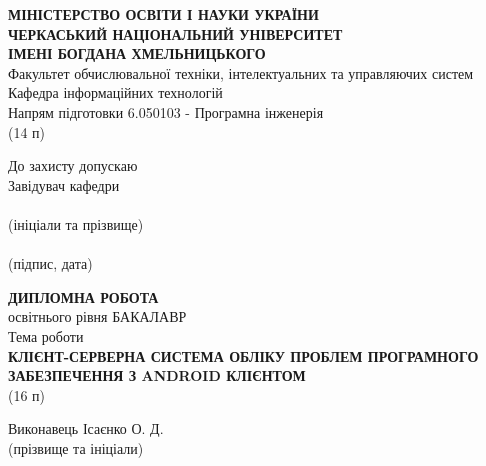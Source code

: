 \documentclass[../main.tex]{subfiles}
\begin{document}
\begin{titlepage}
    \centering
    {\bfseries\large
    \MakeUppercase{Міністерство освіти і науки України} \\
    \MakeUppercase{Черкаський національний університет} \\
    \MakeUppercase{імені Богдана Хмельницького} \\}
    Факультет обчислювальної техніки, інтелектуальних та управляючих систем \\
    Кафедра інформаційних технологій \\
    Напрям підготовки 6.050103 - Програмна інженерія \\
    (14 п) \\
    \begin{flushright}
        \begin{minipage}[t]{5cm}
            \begin{flushright}
            	\footnotesize
                До захисту допускаю \\
                Завідувач кафедри \\
                \hrulefill \\
                {\centering (ініціали та прізвище) \\ }
                \hrulefill \\
                {\centering (підпис, дата) \\ }
            \end{flushright}
        \end{minipage}
    \end{flushright}
    {\scshape\bfseries \MakeUppercase{Дипломна робота} \\}
    освітнього рівня БАКАЛАВР \\
    Тема роботи \\
    {\scshape\bfseries \MakeUppercase{Клієнт-серверна система обліку проблем програмного забезпечення з Android клієнтом} \\}
    (16 п) \\
    {\footnotesize
	    \begin{flushright}
			\begin{minipage}[t]{4.2cm}
				\begin{flushright}
					Виконавець Ісаєнко О. Д. \\
					{\centering (прізвище та ініціали) \\ }
				\end{flushright}
			\end{minipage}
		\end{flushright}
}
\end{titlepage}
\end{document}

